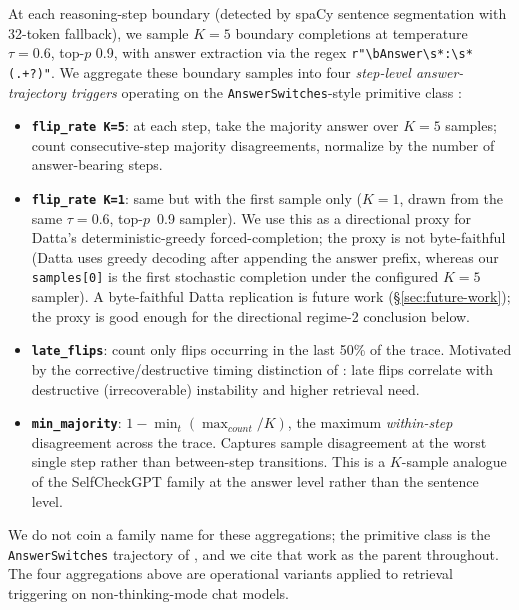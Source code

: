 \documentclass[11pt]{article}
\begin{document}
At each reasoning-step boundary (detected by spaCy sentence segmentation with
32-token fallback), we sample $K{=}5$ boundary completions at temperature
$\tau{=}0.6$, top-$p$ 0.9, with answer extraction via the regex
\texttt{r"\textbackslash bAnswer\textbackslash s*:\textbackslash s*(.+?)"}.
We aggregate these boundary samples into four \emph{step-level
answer-trajectory triggers} operating on the
\texttt{AnswerSwitches}-style primitive class
\citep{Datta_DecideEarlyExplainLater}:

\begin{itemize}
\item \textbf{\texttt{flip\_rate K=5}}: at each step, take the majority answer
over $K{=}5$ samples; count consecutive-step majority disagreements,
normalize by the number of answer-bearing steps.
\item \textbf{\texttt{flip\_rate K=1}}: same but with the first sample only
($K{=}1$, drawn from the same $\tau{=}0.6$, top-$p$~0.9 sampler). We use this
as a directional proxy for Datta's deterministic-greedy forced-completion;
the proxy is not byte-faithful (Datta uses greedy decoding after appending
the answer prefix, whereas our \texttt{samples[0]} is the first stochastic
completion under the configured $K{=}5$ sampler). A byte-faithful Datta
replication is future work (\S\ref{sec:future-work}); the proxy is good
enough for the directional regime-2 conclusion below.
\item \textbf{\texttt{late\_flips}}: count only flips occurring in the last
50\% of the trace. Motivated by the corrective/destructive timing distinction
of \cite{Chen_DynamicInstabilityLLMReasoning}: late flips correlate with
destructive (irrecoverable) instability and higher retrieval need.
\item \textbf{\texttt{min\_majority}}: $1 - \min_t (\max_{count}/K)$, the
maximum \emph{within-step} disagreement across the trace. Captures sample
disagreement at the worst single step rather than between-step transitions.
This is a $K$-sample analogue of the SelfCheckGPT
\citep{Manakul_SelfCheckGPT} family at the answer level rather than the
sentence level.
\end{itemize}

We do not coin a family name for these aggregations; the primitive class is
the \texttt{AnswerSwitches} trajectory of
\citet{Datta_DecideEarlyExplainLater}, and we cite that work as the parent
throughout. The four aggregations above are operational variants applied to
retrieval triggering on non-thinking-mode chat models.
\end{document}
